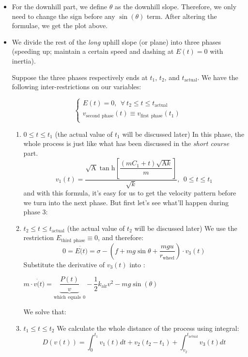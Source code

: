 \documentclass[12pt]{article}
\theoremstyle{definition}
\theoremstyle{remark}
\numberwithin{equation}{section}
\begin{document}
	\begin{itemize}
		\item For the downhill part, we define \(\theta\) as the downhill slope. Therefore, we only need to change the sign before any \(\sin\left(\theta\right)\) term. After altering the formulae, we get the plot above.
		\item We divide the rest of the \textit{long} uphill slope (or plane) into three phases (speeding up; maintain a certain speed and dashing at \(E(t)=0\) with inertia).

			Suppose the three phases respectively ends at \(t_1\), \(t_2\), and \(t_{\mathrm{actual}}\). We have the following inter-restrictions on our variables:

			$$
			\begin{cases}
				E \left( t \right) =0,\:\:\forall \:t_2\le t\le t_{\mathrm{actual}}\\
				v_{\mathrm{second}\:\:\mathrm{phase}}\left( t \right) \equiv v_{\mathrm{first}\:\:\mathrm{phase}}\left( t_1 \right)\\
			\end{cases}
			$$
			\begin{enumerate}
				\item \(0\leq t\leq t_1\) (the actual value of \(t_1\) will be discussed later)
					In this phase, the whole process is just like what has been discussed in the \textit{short course} part.
					\[v_1(t)=\dfrac{\sqrt{\mathrm{A}} \tan \mathrm{h}\left[\dfrac{\left(m C _1+t\right)\sqrt{\mathrm{A}k}}{m}\right]}{\sqrt{ k }},\:\:0\leq t\leq t_1\]
					and with this formula, it's easy for us to get the velocity pattern before we turn into the next phase. But first let's see what'll happen during phase 3:
				\item \(t_2\leq t\leq t_{\mathrm{actual}}\) (the actual value of \(t_2\) will be discussed later)
					We use the restriction \(E_{\mathrm{third\:\:phase}}\equiv 0\), and therefore:
					\[0=E \dot(t)=\sigma-\left(f+mg\sin\theta+\dfrac{mgu}{r_{\mathrm{wheel}}}\right)\cdot v_3(t)\]
					Substitute the derivative of \(v_3(t)\) into :

					\(m \cdot v\dot(t)=\underset{\mathrm{which\:\:equals\:\:}0}{\underbrace{\dfrac{P (t)}{v}}}-\dfrac{1}{2} k_{\mathrm{air}} v^2-mg\sin\left(\theta\right)\) 

					We solve that:

				\item \(t_1\leq t\leq t_2\)
					We calculate the whole distance of the process using integral:
					\[D(v(t))=\int_0^{t_1}v_1(t)dt+v_2(t_2-t_1)+\int_{v_2}^{t_{\mathrm{actual}}}v_3(t)dt\]

			\end{enumerate}
	\end{itemize}
\end{document}
